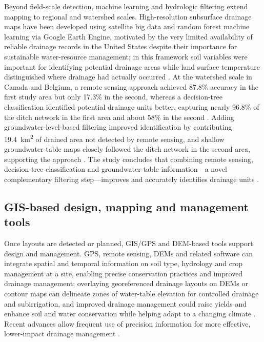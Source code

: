 \documentclass[11pt]{article}
\begin{document}
Beyond field-scale detection, machine learning and hydrologic filtering extend mapping to regional and watershed scales. High-resolution subsurface drainage maps have been developed using satellite big data and random forest machine learning via Google Earth Engine, motivated by the very limited availability of reliable drainage records in the United States despite their importance for sustainable water-resource management; in this framework soil variables were important for identifying potential drainage areas while land surface temperature distinguished where drainage had actually occurred \parencite{Cho2019}. At the watershed scale in Canada and Belgium, a remote sensing approach achieved 87.8\% accuracy in the first study area but only 17.3\% in the second, whereas a decision-tree classification identified potential drainage units better, capturing nearly 96.8\% of the ditch network in the first area and about 58\% in the second \parencite{Yimer2023}. Adding groundwater-level-based filtering improved identification by contributing 19.4~km\textsuperscript{2} of drained area not detected by remote sensing, and shallow groundwater-table maps closely followed the ditch network in the second area, supporting the approach \parencite{Yimer2023}. The study concludes that combining remote sensing, decision-tree classification and groundwater-table information---a novel complementary filtering step---improves and accurately identifies drainage units \parencite{Yimer2023}.

\subsection{GIS-based design, mapping and management tools}

Once layouts are detected or planned, GIS/GPS and DEM-based tools support design and management. GPS, remote sensing, DEMs and related software can integrate spatial and temporal information on soil type, hydrology and crop management at a site, enabling precise conservation practices and improved drainage management; overlaying georeferenced drainage layouts on DEMs or contour maps can delineate zones of water-table elevation for controlled drainage and subirrigation, and improved drainage management could raise yields and enhance soil and water conservation while helping adapt to a changing climate \parencite{Shedekar2018}. Recent advances allow frequent use of precision information for more effective, lower-impact drainage management \parencite{Shedekar2018}.
\end{document}
